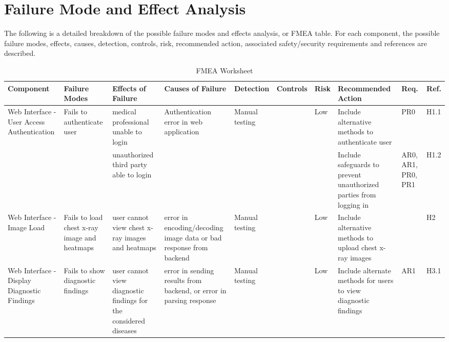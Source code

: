 \documentclass{article}
\begin{document}
\section{Failure Mode and Effect Analysis}
The following is a detailed breakdown of the possible failure modes and effects analysis, or FMEA table. For each component, the possible failure modes, effects, causes, detection, controls, risk, recommended action, associated safety/security requirements and references are described.

\begin{landscape}
\begin{table}[hp]
    \caption{FMEA Worksheet} \label{FMEA}
    \centering
    \begin{footnotesize}
    \begin{tabular}{|p{1in}|p{1in}|p{1in}|p{1.5in}|p{0.6in}|p{0.5in}|p{0.3in}|p{2.5in}|p{0.2in}|p{0.2in}|}
        \toprule
        \textbf{Component} & \textbf{Failure Modes} & \textbf{Effects of Failure} &\textbf{Causes of Failure} & \textbf{Detection} &\textbf{Controls} &\textbf{Risk} &\textbf{Recommended Action} &\textbf{Req.} &\textbf{Ref.} \\
        \bottomrule
        \multirow{2}{1in}{Web Interface - User Access Authentication} & \multirow{2}{1in}{Fails to authenticate user} & medical professional unable to login & \multirow{2}{1.5in}{Authentication error in web application} & \multirow{2}{0.6in}{Manual testing} & & \multirow{2}{0.3in}{Low} & Include alternative methods to authenticate user & PR0 & H1.1 \\
        \cline{3-3}\cline{8-10}
        & & unauthorized third party able to login & & & & & Include safeguards to prevent unauthorized parties from logging in & AR0, AR1, PR0, PR1 & H1.2 \\
        \hline
        Web Interface - Image Load & Fails to load chest x-ray image and heatmaps & user cannot view chest x-ray images and heatmaps & error in encoding/decoding image data or bad response from backend & Manual testing & & Low & Include alternative methods to upload chest x-ray images & & H2 \\
        \hline
        \multirow{2}{1in}{Web Interface - Display Diagnostic Findings} & Fails to show diagnostic findings & user cannot view diagnostic findings for the considered diseases & \multirow{2}{1.5in}{error in sending results from backend, or error in parsing response} & \multirow{2}{0.6in}{Manual testing} & & \multirow{2}{0.3in}{Low} & Include alternate methods for users to view diagnostic findings & AR1 & H3.1 \\

\end{tabular}
\end{footnotesize}
\end{table}
\end{landscape}
\end{document}
